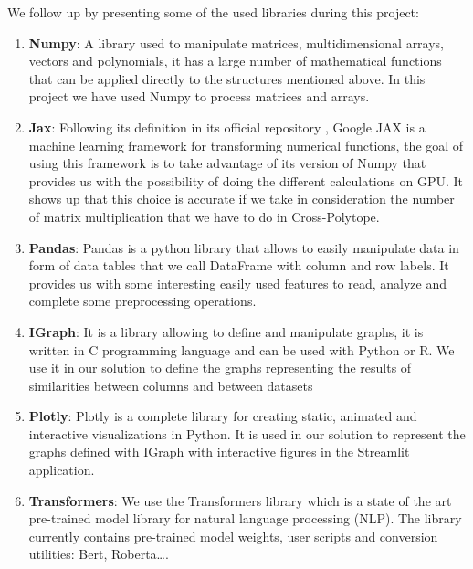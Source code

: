 We follow up by presenting some of the used libraries during this project:

\begin{enumerate}
    \item \textbf{Numpy}:
A library used to manipulate matrices, multidimensional arrays, vectors and
polynomials, it has a large number of mathematical functions that can be applied
directly to the structures mentioned above. In this project we have used Numpy
to process matrices and arrays.
    
    \item \textbf{Jax}:
Following its definition in its official repository \citep{jax_2022}, Google JAX
is a machine learning framework for transforming numerical functions, the goal
of using this framework is to take advantage of its version of Numpy that
provides us with the possibility of doing the different calculations on GPU. It
shows up that this choice is accurate if we take in consideration the number of
matrix multiplication that we have to do in Cross-Polytope.

    \item \textbf{Pandas}:
Pandas is a python library that allows to easily manipulate data in form of data
tables that we call DataFrame with column and row labels. It provides us with
some interesting easily used features to read, analyze and complete some
preprocessing operations.

    \item \textbf{IGraph}:
It is a library allowing to define and manipulate graphs, it is written in C
programming language and can be used with Python or R. We use it in our solution
to define the graphs representing the results of similarities between columns
and between datasets

    \item \textbf{Plotly}:
Plotly is a complete library for creating static, animated and interactive
visualizations in Python. It is used in our solution to represent the graphs
defined with IGraph with interactive figures in the Streamlit application.

    \item \textbf{Transformers}:
We use the Transformers library which is a state of the art pre-trained model
library for natural language processing (NLP). The library currently contains
pre-trained model weights, user scripts and conversion utilities: Bert,
Roberta\ldots.

\end{enumerate}


